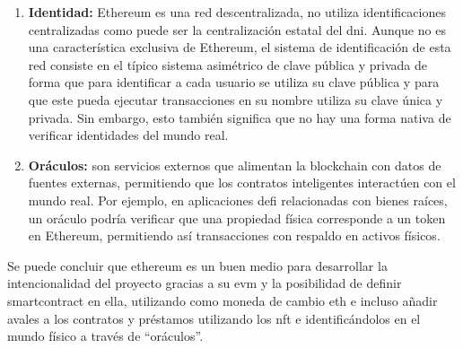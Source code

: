 \begin{enumerate}
        Además, Ethereum introdujo el concepto de  \enquote{tokenización}, 
        esto permite representar activos o derechos a través de \gls{token}.
        Para facilitar el uso y transferencia de estos, se han creado distintos 
        estándares como por ejemplo:
        \begin{enumerate}
            \item ERC-20~\cite{erc-20}: tokens fungibles, cuyas unidades son intercambiables entre sí, como puede ser una criptomoneda.
            \item ERC-721~\cite{erc-721} tokens no fungibles, que permiten distinguir cada token individualmente, pudiéndose usar para representar
                 activos en la vida real o distintos derechos de usuario como una votación.
            \item ERC-1155~\cite{erc-1155}: permite gestionar distintos tipos de tokens en una misma operación,
             tanto fungibles como no fungibles, en un mismo contrato.
        \end{enumerate}

        \item \textbf{Identidad:} Ethereum es una red descentralizada, no utiliza
        identificaciones centralizadas como puede ser la centralización estatal del 
        \gls{dni}.
        Aunque no es una característica exclusiva de Ethereum, el sistema de 
        identificación de esta red consiste en el típico sistema asimétrico de clave 
        pública y privada de forma que para identificar a cada usuario se utiliza 
        su clave pública y para que este pueda ejecutar transacciones en su nombre 
        utiliza su clave única y privada.
        Sin embargo, esto también significa que no hay una forma nativa de verificar 
        identidades del mundo real.
        
        \item \textbf{Oráculos:} son servicios externos que alimentan la blockchain
        con datos de fuentes externas, permitiendo que los contratos inteligentes 
        interactúen con el mundo real. Por ejemplo, en aplicaciones \gls{defi} 
        relacionadas con bienes raíces, un oráculo podría verificar que una propiedad 
        física corresponde a un token en Ethereum, permitiendo así transacciones con 
        respaldo en activos físicos.
    
    \end{enumerate}

Se puede concluir que \gls{ethereum} es un buen  medio para  desarrollar la
intencionalidad del proyecto gracias a su \gls{evm} y la posibilidad de definir
\gls{smartcontract} en ella, utilizando como moneda de cambio \gls{eth} e incluso 
añadir avales a los contratos y préstamos utilizando los \gls{nft} e identificándolos 
en el mundo físico a través de \enquote{oráculos}.


